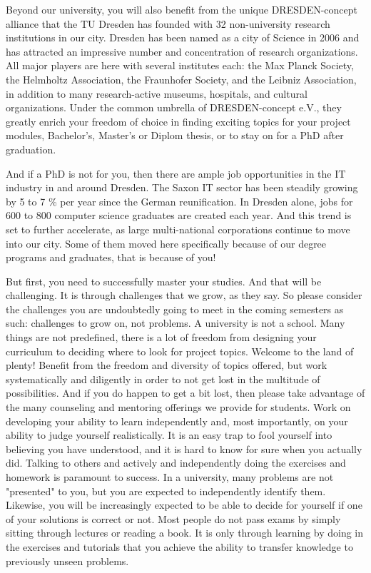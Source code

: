 {Beyond our university, you will also benefit from the unique DRESDEN-concept alliance that the TU Dresden has founded with 32 non-university research institutions in our city. Dresden has been named as a city of Science in 2006 and has attracted an impressive number and concentration of research organizations. All major players are here with several institutes each: the Max Planck Society, the Helmholtz Association, the Fraunhofer Society, and the Leibniz Association, in addition to many research-active museums, hospitals, and cultural organizations. Under the common umbrella of DRESDEN-concept e.V., they greatly enrich your freedom of choice in finding exciting topics for your project modules, Bachelor's, Master's or Diplom thesis, or to stay on for a PhD after graduation. 

And if a PhD is not for you, then there are ample job opportunities in the IT industry in and around Dresden. The Saxon IT sector has been steadily growing by 5 to 7 \% per year since the German reunification. In Dresden alone, jobs for 600 to 800 computer science graduates are created each year. And this trend is set to further accelerate, as large multi-national corporations continue to move into our city. Some of them moved here specifically because of our degree programs and graduates,  that is because of you!

But first, you need to successfully master your studies. And that will be challenging. It is through challenges that we grow, as they say. So please consider the challenges you are undoubtedly going to meet in the coming semesters as such: challenges to grow on, not problems. A university is not a school. Many things are not predefined, there is a lot of freedom from designing your curriculum to deciding where to look for project topics. Welcome to the land of plenty! Benefit from the freedom and diversity of topics offered, but work systematically and diligently in order to not get lost in the multitude of possibilities. And if you do happen to get a bit lost, then please take advantage of the many counseling and mentoring offerings we provide for students. Work on developing your ability to learn independently and, most importantly, on your ability to judge yourself realistically. It is an easy trap to fool yourself into believing you have understood, and it is hard to know for sure when you actually did. Talking to others and actively and independently doing the exercises and homework is paramount to success. In a university, many problems are not "presented" to you, but you are expected to independently identify them. Likewise, you will be increasingly expected to be able to decide for yourself if one of your solutions is correct or not. Most people do not pass exams by simply sitting through lectures or reading a book. It is only through learning by doing in the exercises and tutorials that you achieve the ability to transfer knowledge to previously unseen problems. 

}
